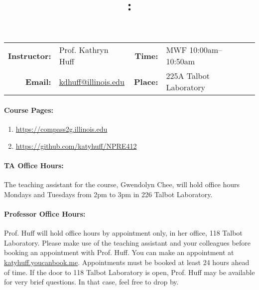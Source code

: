 \documentclass[11pt, a4paper]{article}
\title{\CourseNumber: \CourseTitle\\}
\author{\CourseUniversity}
\date{\CourseSemester \CourseYear}
\makeatletter
\newcommand{\CourseNumber}{NPRE412}
\newcommand{\CourseInstructor}{Prof. Kathryn Huff\xspace}%
\newcommand{\CourseDays}{MWF\xspace}%
\newcommand{\CourseStart}{10:00am\xspace}%
\newcommand{\CourseEnd}{10:50am\xspace}%
\newcommand{\CourseInstructorEmail}{kdhuff@illinois.edu}
\newcommand{\HuffOfficeHourPlace}{118 Talbot Laboratory\xspace}
\newcommand{\CourseRoom}{225A\xspace}%
\newcommand{\CourseBuilding}{Talbot Laboratory\xspace}%
\newcommand{\TeachingAssistant}{Gwendolyn Chee\xspace}%
\newcommand{\TAOfficeHourDays}{Mondays and Tuesdays\xspace}%
\newcommand{\TAOfficeHourStart}{2pm\xspace}%
\newcommand{\TAOfficeHourEnd}{3pm\xspace}%
\newcommand{\TAOfficeHourPlace}{226 Talbot Laboratory\xspace}
\makeatother
\begin{document}
\maketitle
\renewcommand{\arraystretch}{1.5}
\begin{center}
\begin{table}[h]
\begin{tabularx}{\textwidth}{rXrX}
\hline
\textbf{Instructor:} & \CourseInstructor & \textbf{Time:} & \CourseDays \CourseStart -- \CourseEnd \\
\textbf{Email:} &  \href{mailto:\CourseInstructorEmail}{\CourseInstructorEmail} & \textbf{Place:} & \CourseRoom \CourseBuilding\\
\hline
\end{tabularx}
\end{table}
\end{center}

\paragraph{Course Pages:}
\begin{enumerate}
        \item \url{https://compass2g.illinois.edu}
        \item \url{https://github.com/katyhuff/\CourseNumber}
\end{enumerate}

\paragraph{TA Office Hours:} The teaching assistant for the course, 
\TeachingAssistant, will hold office hours \TAOfficeHourDays from 
\TAOfficeHourStart to \TAOfficeHourEnd in \TAOfficeHourPlace.



\paragraph{Professor Office Hours:} Prof. Huff will hold office hours by appointment
only, in her office, \HuffOfficeHourPlace. Please make use of the teaching
assistant and your colleagues before booking an appointment with Prof. Huff.
You can make an appointment at \url{katyhuff.youcanbook.me}. Appointments 
must be booked at least 24 hours ahead of time.
If the door to \HuffOfficeHourPlace is open, Prof. Huff may be available for very brief 
questions. In that case, feel free to drop by.
\end{document}
